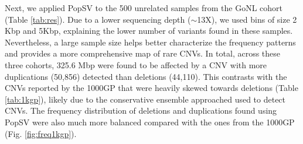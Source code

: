 Next, we applied {\sf PopSV} to the 500 unrelated samples from the GoNL cohort (Table \ref{tab:res}).
Due to a lower sequencing depth ($\sim$13X), we used bins of size 2 Kbp and 5Kbp, explaining the lower number of variants found in these samples.
Nevertheless, a large sample size helps better characterize the frequency patterns and provides a more comprehensive map of rare CNVs.
In total, across these three cohorts, 325.6 Mbp were found to be affected by a CNV with more duplications (50,856) detected than deletions (44,110).
This contrasts with the CNVs reported by the 1000GP\cite{Sudmant2015a} that were heavily skewed towards deletions (Table \ref{tab:1kgp}), likely due to the conservative ensemble approached used to detect CNVs.
The frequency distribution of deletions and duplications found using {\sf PopSV} were also much more balanced compared with the ones from the 1000GP\cite{Sudmant2015a} (Fig. \ref{fig:freq1kgp}).

